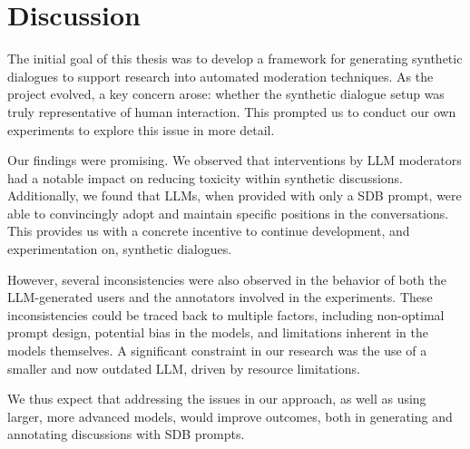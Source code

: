 %
\chapter{Discussion}
\label{sec:discusision}

The initial goal of this thesis was to develop a framework for generating synthetic dialogues to support research into automated moderation techniques. As the project evolved, a key concern arose: whether the synthetic dialogue setup was truly representative of human interaction. This prompted us to conduct our own experiments to explore this issue in more detail.

Our findings were promising. We observed that interventions by LLM moderators had a notable impact on reducing toxicity within synthetic discussions. Additionally, we found that LLMs, when provided with only a \ac{SDB} prompt, were able to convincingly adopt and maintain specific positions in the conversations. This provides us with a concrete incentive to continue development, and experimentation on, synthetic dialogues.

However, several inconsistencies were also observed in the behavior of both the LLM-generated users and the annotators involved in the experiments. These inconsistencies could be traced back to multiple factors, including non-optimal prompt design, potential bias in the models, and limitations inherent in the models themselves. A significant constraint in our research was the use of a smaller and now outdated LLM, driven by resource limitations.

We thus expect that addressing the issues in our approach, as well as using larger, more advanced models, would improve outcomes, both in generating and annotating discussions with \ac{SDB} prompts.